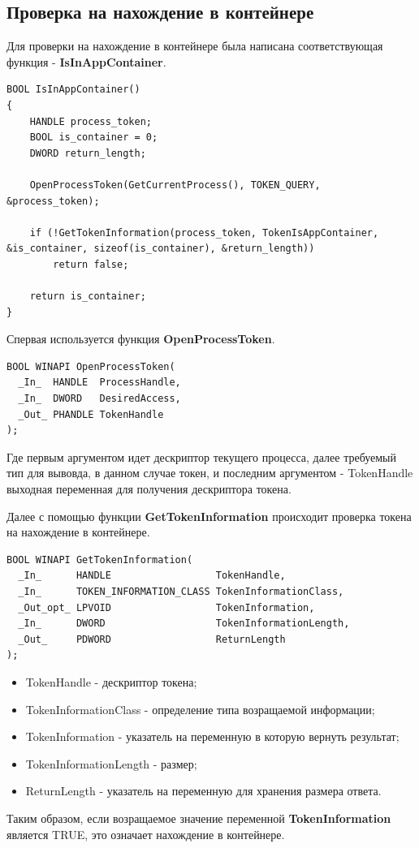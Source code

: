 \subsection{Проверка на нахождение в контейнере}
Для проверки на нахождение в контейнере была написана соответствующая функция - \textbf{IsInAppContainer}.
\begin{lstlisting}[language={}, caption={Фрагмент кода, по проверки работы в контейнере}]
BOOL IsInAppContainer()
{
	HANDLE process_token;
	BOOL is_container = 0;
	DWORD return_length;

	OpenProcessToken(GetCurrentProcess(), TOKEN_QUERY, &process_token);

	if (!GetTokenInformation(process_token, TokenIsAppContainer, &is_container, sizeof(is_container), &return_length))
		return false;

	return is_container;
}
\end{lstlisting}
Спервая используется функция \textbf{OpenProcessToken}\cite{OpenProcessToken}.
\begin{lstlisting}[language={}, caption={Прототип OpenProcessToken}]
BOOL WINAPI OpenProcessToken(
  _In_  HANDLE  ProcessHandle,
  _In_  DWORD   DesiredAccess,
  _Out_ PHANDLE TokenHandle
);
\end{lstlisting}
Где первым аргументом идет дескриптор текущего процесса, далее требуемый тип для вывовда, в данном случае токен, и последним аргументом - TokenHandle выходная переменная для получения дескриптора токена.

Далее с помощью функции \textbf{GetTokenInformation}\cite{GetTokenInformation} происходит проверка токена на нахождение в контейнере.
\begin{lstlisting}[language={}, caption={Прототип GetTokenInformation}]
BOOL WINAPI GetTokenInformation(
  _In_      HANDLE                  TokenHandle,
  _In_      TOKEN_INFORMATION_CLASS TokenInformationClass,
  _Out_opt_ LPVOID                  TokenInformation,
  _In_      DWORD                   TokenInformationLength,
  _Out_     PDWORD                  ReturnLength
);
\end{lstlisting}
\begin{itemize}
\item TokenHandle - дескриптор токена;
\item TokenInformationClass - определение типа возращаемой информации;
\item TokenInformation - указатель на переменную в которую вернуть результат;
\item TokenInformationLength - размер;
\item ReturnLength - указатель на переменную для хранения размера ответа.
\end{itemize}
Таким образом, если возращаемое значение переменной \textbf{TokenInformation} является TRUE, это означает нахождение в контейнере.


